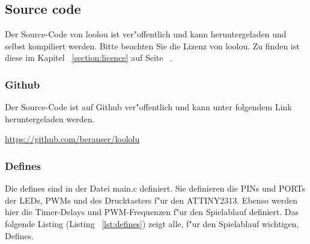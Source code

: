 \newpage
\subsection{Source code}

Der Source-Code von loolou ist ver"offentlich und kann heruntergeladen und selbst kompiliert werden.
Bitte beachten Sie die Lizenz von loolou. Zu finden ist diese im Kapitel ~\ref{section:licence} auf Seite ~\pageref{section:licence}.
\subsubsection{Github}\label{subsubsection:github}

Der Source-Code ist auf Github ver"offentlich und kann unter folgendem Link heruntergeladen werden. \\
\begin{center}\href{https://github.com/berauser/loololu}{https://github.com/berauser/loololu}\end{center}
\vspace{0.5cm}

\subsubsection{Defines}

Die defines sind in der Datei main.c definiert. Sie definieren die PINs und PORTs der LEDs, PWMs und des Drucktasters f"ur den ATTINY2313.
Ebenso werden hier die Timer-Delays und PWM-Frequenzen f"ur den Spielablauf definiert. Das folgende Listing (Listing ~\ref{lst:defines}) zeigt alle, f"ur den Spielablauf wichtigen, Defines. 

